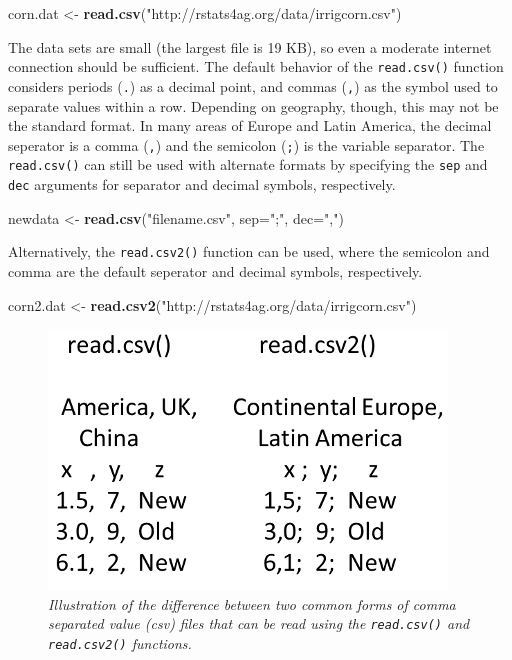 \documentclass[letterpaper,]{book}
\newenvironment{Shaded}{\begin{snugshade}}{\end{snugshade}}
\newcommand{\DataTypeTok}[1]{\textcolor[rgb]{0.13,0.29,0.53}{#1}}
\newcommand{\KeywordTok}[1]{\textcolor[rgb]{0.13,0.29,0.53}{\textbf{#1}}}
\newcommand{\NormalTok}[1]{#1}
\newcommand{\StringTok}[1]{\textcolor[rgb]{0.31,0.60,0.02}{#1}}
\begin{document}
\begin{Shaded}
\begin{Highlighting}[]
\NormalTok{corn.dat <-}\StringTok{ }\KeywordTok{read.csv}\NormalTok{(}\StringTok{"http://rstats4ag.org/data/irrigcorn.csv"}\NormalTok{)}
\end{Highlighting}
\end{Shaded}

The data sets are small (the largest file is 19 KB), so even a moderate internet connection should be sufficient. The default behavior of the \texttt{read.csv()} function considers periods (\texttt{.}) as a decimal point, and commas (\texttt{,}) as the symbol used to separate values within a row. Depending on geography, though, this may not be the standard format. In many areas of Europe and Latin America, the decimal seperator is a comma (\texttt{,}) and the semicolon (\texttt{;}) is the variable separator. The \texttt{read.csv()} can still be used with alternate formats by specifying the \texttt{sep} and \texttt{dec} arguments for separator and decimal symbols, respectively.

\begin{Shaded}
\begin{Highlighting}[]
\NormalTok{newdata <-}\StringTok{ }\KeywordTok{read.csv}\NormalTok{(}\StringTok{"filename.csv"}\NormalTok{, }\DataTypeTok{sep=}\StringTok{";"}\NormalTok{, }\DataTypeTok{dec=}\StringTok{","}\NormalTok{)}
\end{Highlighting}
\end{Shaded}

Alternatively, the \texttt{read.csv2()} function can be used, where the semicolon and comma are the default seperator and decimal symbols, respectively.

\begin{Shaded}
\begin{Highlighting}[]
\NormalTok{corn2.dat <-}\StringTok{ }\KeywordTok{read.csv2}\NormalTok{(}\StringTok{"http://rstats4ag.org/data/irrigcorn.csv"}\NormalTok{)}
\end{Highlighting}
\end{Shaded}

\begin{figure}
\centering
\includegraphics{csvFiles.png}
\caption{\label{fig:csvPlot}\emph{Illustration of the difference between two common forms of comma separated value (csv) files that can be read using the \texttt{read.csv()} and \texttt{read.csv2()} functions.}}
\end{figure}
\end{document}
